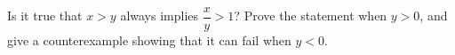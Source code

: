 Is it true that $x>y$ always implies $\dfrac {x}{y}>1$? Prove the statement when $y>0$, and give a counterexample showing that it can fail when $y<0$.
